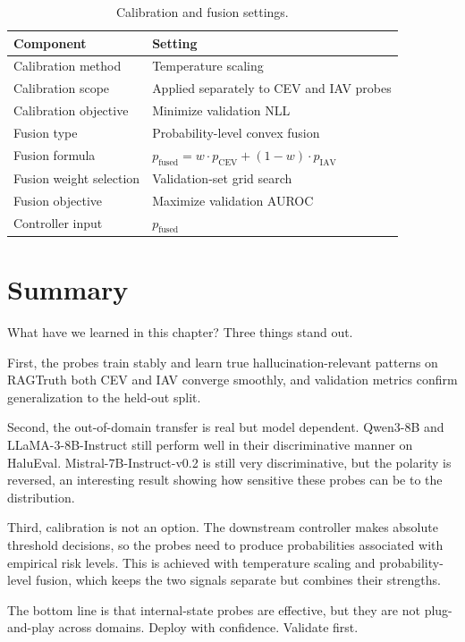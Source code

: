 \begin{table}[!htb]
\centering
\caption{Calibration and fusion settings.}
\label{tab:calibration_settings}
\begin{tabular}{@{}ll@{}}
\toprule
\textbf{Component} & \textbf{Setting} \\
\midrule
Calibration method        & Temperature scaling \\
Calibration scope         & Applied separately to CEV and IAV probes \\
Calibration objective     & Minimize validation NLL \\
Fusion type               & Probability-level convex fusion \\
Fusion formula            & $p_{\text{fused}} = w \cdot p_{\text{CEV}} + (1-w) \cdot p_{\text{IAV}}$ \\
Fusion weight selection   & Validation-set grid search \\
Fusion objective          & Maximize validation AUROC \\
Controller input          & $p_{\text{fused}}$ \\
\bottomrule
\end{tabular}
\end{table}

\newpage
\section{Summary}
\label{sec:ch6_summary}

What have we learned in this chapter? Three things stand out.

First, the probes train stably and learn true hallucination-relevant patterns on RAGTruth both CEV and IAV converge smoothly, and validation metrics confirm generalization to the held-out split.

Second, the out-of-domain transfer is real but model dependent. Qwen3-8B and LLaMA-3-8B-Instruct still perform well in their discriminative manner on HaluEval. Mistral-7B-Instruct-v0.2 is still very discriminative, but the polarity is reversed, an interesting result showing how sensitive these probes can be to the distribution.

Third, calibration is not an option. The downstream controller makes absolute threshold decisions, so the probes need to produce probabilities associated with empirical risk levels. This is achieved with temperature scaling and probability-level fusion, which keeps the two signals separate but combines their strengths.

The bottom line is that internal-state probes are effective, but they are not plug-and-play across domains. Deploy with confidence. Validate first.
